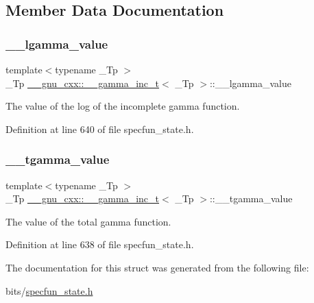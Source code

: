 \subsection{Member Data Documentation}
\mbox{\label{struct____gnu__cxx_1_1____gamma__inc__t_a193b3f7871e371363571fe90b1ce1767}} 
\subsubsection{\texorpdfstring{\+\_\+\+\_\+lgamma\+\_\+value}{\_\_lgamma\_value}}
{\footnotesize\ttfamily template$<$typename \+\_\+\+Tp $>$ \\
\+\_\+\+Tp \hyperlink{struct____gnu__cxx_1_1____gamma__inc__t}{\+\_\+\+\_\+gnu\+\_\+cxx\+::\+\_\+\+\_\+gamma\+\_\+inc\+\_\+t}$<$ \+\_\+\+Tp $>$\+::\+\_\+\+\_\+lgamma\+\_\+value}



The value of the log of the incomplete gamma function. 



Definition at line 640 of file specfun\+\_\+state.\+h.

\mbox{\label{struct____gnu__cxx_1_1____gamma__inc__t_a53d4ffc984c6685ce328caff424b5fe4}} 
\subsubsection{\texorpdfstring{\+\_\+\+\_\+tgamma\+\_\+value}{\_\_tgamma\_value}}
{\footnotesize\ttfamily template$<$typename \+\_\+\+Tp $>$ \\
\+\_\+\+Tp \hyperlink{struct____gnu__cxx_1_1____gamma__inc__t}{\+\_\+\+\_\+gnu\+\_\+cxx\+::\+\_\+\+\_\+gamma\+\_\+inc\+\_\+t}$<$ \+\_\+\+Tp $>$\+::\+\_\+\+\_\+tgamma\+\_\+value}



The value of the total gamma function. 



Definition at line 638 of file specfun\+\_\+state.\+h.



The documentation for this struct was generated from the following file\+:\begin{DoxyCompactItemize}
\item 
bits/\hyperlink{specfun__state_8h}{specfun\+\_\+state.\+h}\end{DoxyCompactItemize}
